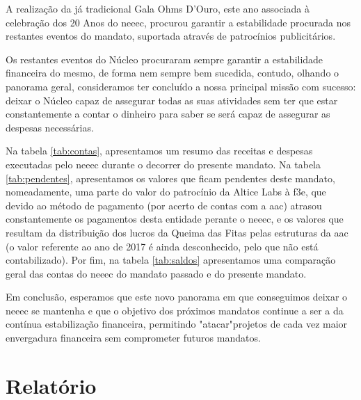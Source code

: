 A realização da já tradicional Gala Ohms D'Ouro, este ano associada à celebração dos 20 Anos do \acrshort{neeec}, procurou garantir a estabilidade procurada nos restantes eventos do mandato, suportada através de patrocínios publicitários.

Os restantes eventos do Núcleo procuraram sempre garantir a estabilidade financeira do mesmo, de forma nem sempre bem sucedida, contudo, olhando o panorama geral, consideramos ter concluído a nossa principal missão com sucesso: deixar o Núcleo capaz de assegurar todas as suas atividades sem ter que estar constantemente a contar o dinheiro para saber se será capaz de assegurar as despesas necessárias.

Na tabela \ref{tab:contas}, apresentamos um resumo das receitas e despesas executadas pelo \acrshort{neeec} durante o decorrer do presente mandato. Na tabela \ref{tab:pendentes}, apresentamos os valores que ficam pendentes deste mandato, nomeadamente, uma parte do valor do patrocínio da Altice Labs à \acrshort{f3e}, que devido ao método de pagamento (por acerto de contas com a \acrshort{aac}) atrasou constantemente os pagamentos desta entidade perante o \acrshort{neeec}, e os valores que resultam da distribuição dos lucros da Queima das Fitas pelas estruturas da \acrshort{aac} (o valor referente ao ano de 2017 é ainda desconhecido, pelo que não está contabilizado). Por fim, na tabela \ref{tab:saldos} apresentamos uma comparação geral das contas do \acrshort{neeec} do mandato passado e do presente mandato.

Em conclusão, esperamos que este novo panorama em que conseguimos deixar o \acrshort{neeec} se mantenha e que o objetivo dos próximos mandatos continue a ser a da contínua estabilização financeira, permitindo "atacar"\space projetos de cada vez maior envergadura financeira sem comprometer futuros mandatos.

\section{Relatório}

{ %


}
{ %


}